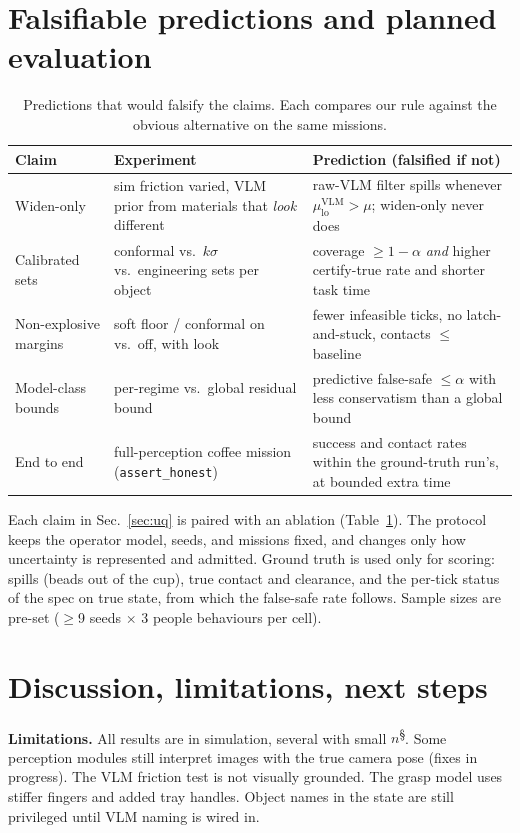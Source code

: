 \documentclass[10pt,twocolumn,letterpaper]{article}
\newcommand{\pre}{\textsuperscript{\S}}   %
\begin{document}
\section{Falsifiable predictions and planned evaluation}
\begin{table}[t]
\centering\footnotesize
\caption{Predictions that would falsify the claims. Each compares our rule against the obvious alternative on the same missions.}
\label{tab:pred}
\begin{tabular}{@{}p{1.15cm}p{3.0cm}p{3.35cm}@{}}
\toprule
Claim & Experiment & Prediction (falsified if not)\\
\midrule
Widen-only & sim friction varied, VLM prior from materials that \emph{look} different & raw-VLM filter spills whenever $\mu_{\mathrm{lo}}^{\mathrm{VLM}}>\mu$; widen-only never does\\
Calibrated sets & conformal vs.\ $k\sigma$ vs.\ engineering sets per object & coverage $\ge1-\alpha$ \emph{and} higher certify-true rate and shorter task time\\
Non-explosive margins & soft floor / conformal on vs.\ off, with look & fewer infeasible ticks, no latch-and-stuck, contacts $\le$ baseline\\
Model-class bounds & per-regime vs.\ global residual bound & predictive false-safe $\le\alpha$ with less conservatism than a global bound\\
End to end & full-perception coffee mission (\texttt{assert\_honest}) & success and contact rates within the ground-truth run's, at bounded extra time\\
\bottomrule
\end{tabular}
\end{table}
Each claim in Sec.~\ref{sec:uq} is paired with an ablation (Table~\ref{tab:pred}). The protocol keeps the operator model, seeds, and
missions fixed, and changes only how uncertainty is represented and admitted. Ground truth is used only for scoring: spills (beads out of
the cup), true contact and clearance, and the per-tick status of the spec on true state, from which the false-safe rate follows. Sample sizes are pre-set ($\ge$9 seeds $\times$ 3 people behaviours per cell).

\section{Discussion, limitations, next steps}
\textbf{Limitations.} All results are in simulation, several with small $n$\pre. Some perception modules still interpret images with the
true camera pose (fixes in progress). The VLM friction test is not visually grounded. The grasp model uses stiffer fingers and added tray
handles. Object names in the state are still privileged until VLM naming is wired in.
\end{document}
